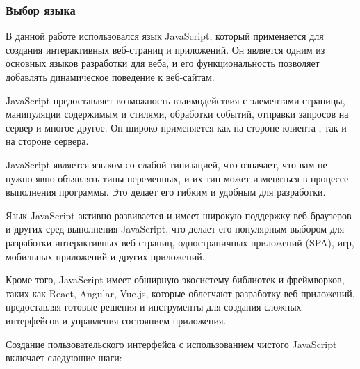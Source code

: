 \subsubsection{Выбор языка}

В данной работе использовался язык JavaScript, который применяется для создания интерактивных веб-страниц и приложений. Он является одним из основных языков разработки для веба, и его функциональность позволяет добавлять динамическое поведение к веб-сайтам.

JavaScript предоставляет возможность взаимодействия с элементами страницы, манипуляции содержимым и стилями, обработки событий, отправки запросов на сервер и многое другое. Он широко применяется как на стороне клиента , так и на стороне сервера.

JavaScript является языком со слабой типизацией, что означает, что вам не нужно явно объявлять типы переменных, и их тип может изменяться в процессе выполнения программы. Это делает его гибким и удобным для разработки.

Язык JavaScript активно развивается и имеет широкую поддержку веб-браузеров и других сред выполнения JavaScript, что делает его популярным выбором для разработки интерактивных веб-страниц, одностраничных приложений (SPA), игр, мобильных приложений и других приложений.

Кроме того, JavaScript имеет обширную экосистему библиотек и фреймворков, таких как React, Angular, Vue.js, которые облегчают разработку веб-приложений, предоставляя готовые решения и инструменты для создания сложных интерфейсов и управления состоянием приложения.

Создание пользовательского интерфейса с использованием чистого JavaScript включает следующие шаги:

